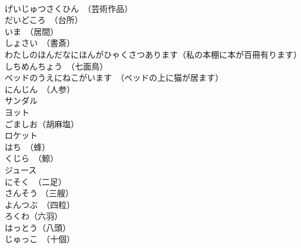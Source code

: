 \documentclass[8pt]{extreport}
\begin{document}
\begin{CJK}{UTF8}{min}
\\	げいじゅつさくひん　（芸術作品）	
\\	だいどころ　（台所）	
\\	いま　（居間）	
\\	しょさい　（書斎）	
\\	わたしのほんだなにほんがひゃくさつあります（私の本棚に本が百冊有ります）	
\\	しちめんちょう　（七面鳥）	
\\	ベッドのうえにねこがいます　（ベッドの上に猫が居ます）	
\\	にんじん　（人参）	
\\	サンダル	
\\	ヨット	
\\	ごましお（胡麻塩）	
\\	ロケット	
\\	はち　（蜂）	
\\	くじら　（鯨）	
\\	ジュース	
\\	にそく　（二足）	
\\	さんそう （三艘）	
\\	よんつぶ　（四粒）	
\\	ろくわ（六羽）	
\\	はっとう（八頭）	
\\	じゅっこ　（十個）	
\end{CJK}
\end{document}
